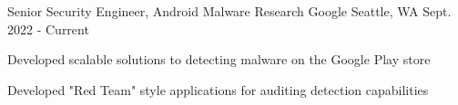 


\begin{cventries}




\cventry
{Senior Security Engineer, Android Malware Research} %
{Google} %
{Seattle, WA} %
{Sept. 2022 - Current} %
{ %
\begin{cvitems}
    \item {Developed scalable solutions to detecting malware on the Google Play store}
    \item {Developed "Red Team" style applications for auditing detection capabilities}
\end{cvitems}
}



\end{cventries}
